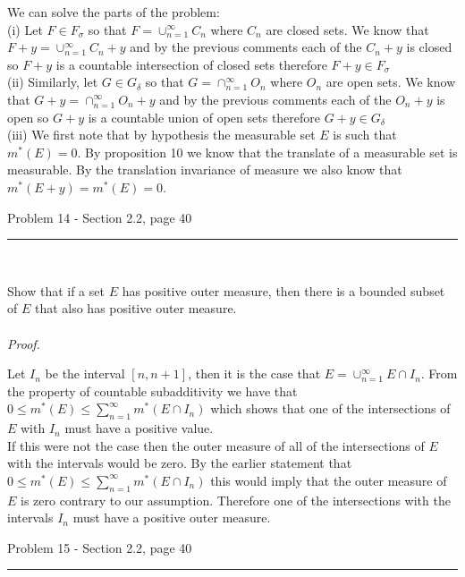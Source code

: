 \documentclass[11pt,reqno]{article}
\begin{document}
\noindent We can solve the parts of the problem:\\

\noindent (i) Let $F \in F_\sigma$ so that $F = \cup^\infty_{n = 1} C_n$ where $C_n$ are closed sets. We know that $F + y = \cup^\infty_{n = 1} C_n + y$ and by the previous comments each of the $C_n + y$ is closed so $F + y$ is a countable intersection of closed sets therefore $F + y \in F_\sigma$\\

\noindent (ii) Similarly, let $G \in G_\delta$ so that $G = \cap^\infty_{n = 1} O_n$ where $O_n$ are open sets. We know that $G + y = \cap^\infty_{n = 1} O_n + y$ and by the previous comments each of the $O_n + y$ is open so $G + y$ is a countable union of open sets therefore $G + y \in G_\delta$\\

\noindent (iii) We first note that by hypothesis the measurable set $E$ is such that $m^*(E) = 0$. By proposition 10 we know that the translate of a measurable set is measurable. By the translation invariance of measure we also know that $m^*(E  +y) = m^*(E) = 0$.

\begin{flushleft} 
Problem 14 - Section 2.2, page 40\\
\rule{500pt}{1pt}\\
\end{flushleft} 

Show that if a set $E$ has positive outer measure, then there is a bounded subset of $E$ that also has positive outer measure.
\\\\ \emph{Proof.}
 
Let $I_n$ be the interval $[n, n + 1] $,  then it is the case that $E = \cup_{n = 1} ^\infty  E\cap I_n $.  From the property of countable subadditivity we have that $0 \le m^*(E) \le \sum_{n  = 1}^\infty m^*(E\cap I_n)$ which shows that one of the intersections of $E$ with $I_n$ must have a positive value. \\
\indent If this were not the case then the outer measure of all of the intersections of $E$ with the intervals would be zero. By the earlier statement that $0 \le m^*(E) \le \sum_{n  = 1}^\infty m^*(E\cap I_n)$ this would imply that the outer measure of $E$ is zero contrary to our assumption. Therefore one of the intersections with the intervals $I_n$ must have a positive outer measure.

\begin{flushleft} 
Problem 15 - Section 2.2, page 40\\
\rule{500pt}{1pt}\\
\end{flushleft} 
\end{document}

